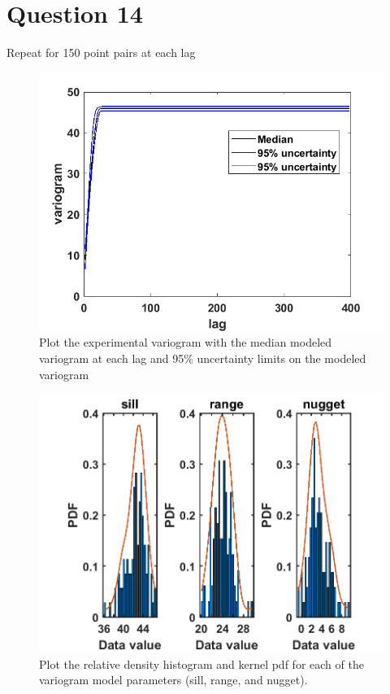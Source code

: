 \documentclass[
	12pt, %
]{fphw}
\begin{document}
\clearpage
 \section*{Question 14 }

\begin{problem}
Repeat for 150 point pairs at each lag
\end{problem}
 \begin{figure}[htbp]
	\centering
	\includegraphics[width=0.55\columnwidth]{Q14_1.png} 
	\caption{Plot the experimental variogram with the median modeled variogram at each lag and 95\%
		uncertainty limits on the modeled variogram  }
\end{figure}

 \begin{figure}[htbp]
	\centering
	\includegraphics[width=.72\columnwidth]{Q14_2.png} 
	\caption{Plot the relative density histogram and kernel pdf for each of the variogram model parameters (sill, range, and nugget). }
\end{figure}
\end{document}
